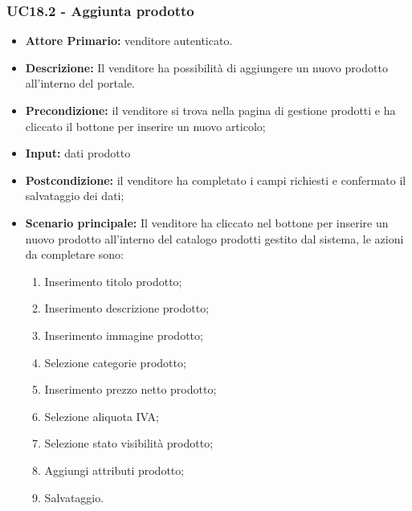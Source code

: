 \subsubsection{UC18.2 - Aggiunta prodotto}
\begin{itemize}
    \item \textbf{Attore Primario:}  venditore autenticato.
    \item \textbf{Descrizione:} Il venditore ha possibilità di aggiungere un nuovo prodotto all’interno del portale.
    \item \textbf{Precondizione:} il venditore  si trova nella pagina di gestione prodotti e ha cliccato il bottone per inserire un nuovo articolo;
    \item \textbf{Input:} dati prodotto
    \item \textbf{Postcondizione:} il venditore ha completato i campi richiesti e confermato il salvataggio dei dati;
    \item \textbf{Scenario principale:} Il venditore ha cliccato nel bottone per inserire un nuovo prodotto all’interno del catalogo prodotti gestito dal sistema, le azioni da completare sono: 
    \begin{enumerate}
        \item Inserimento titolo prodotto;
        \item Inserimento descrizione prodotto;
        \item Inserimento immagine prodotto;
        \item Selezione categorie prodotto;
        \item Inserimento prezzo netto prodotto;
        \item Selezione aliquota IVA;
        \item Selezione stato visibilità prodotto; 
        \item Aggiungi attributi prodotto;
        \item Salvataggio.
    \end{enumerate}
\end{itemize}


